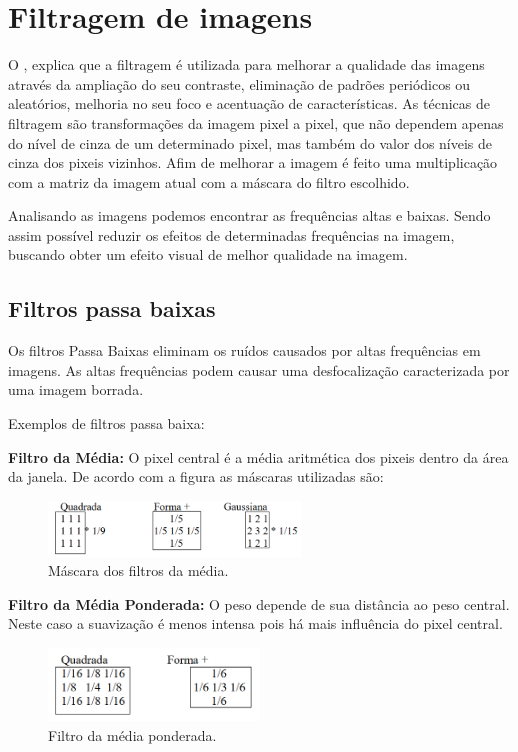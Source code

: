 \documentclass{article}
\begin{document}
\section{Filtragem de imagens}
     O , explica que a filtragem é utilizada para melhorar a qualidade das imagens através da ampliação do seu contraste, eliminação  de  padrões  periódicos  ou aleatórios, melhoria  no  seu  foco  e  acentuação  de características. As técnicas de filtragem são transformações da imagem pixel a pixel, que não dependem apenas do nível de cinza de um determinado pixel, mas também do valor dos níveis de cinza dos pixeis vizinhos. Afim de melhorar a imagem é feito uma multiplicação com a matriz da imagem atual com a máscara do filtro escolhido.
    
    Analisando as imagens  podemos  encontrar as frequências altas e baixas. Sendo assim possível  reduzir  os  efeitos  de determinadas  frequências  na imagem,  buscando obter  um  efeito  visual  de  melhor  qualidade  na  imagem.  
    
    \subsection{Filtros passa baixas}
    Os  filtros Passa  Baixas  eliminam os ruídos causados por altas frequências em imagens. As altas frequências podem causar uma  desfocalização caracterizada  por  uma  imagem borrada.
    
    Exemplos de filtros passa baixa:
     
    \textbf{Filtro da Média:} O pixel central é a média aritmética dos pixeis dentro da área da janela. De acordo com a figura as máscaras utilizadas são:
    
    \begin{figure}[H]
        \centering
        \includegraphics[width=0.6\textwidth]{template/img/fig5.png}
        \caption{Máscara dos filtros da média.}
        \label{fig:fig5}
    \end{figure}
    
    \textbf{Filtro da Média Ponderada:} O peso depende de sua distância ao peso central. Neste  caso  a  suavização  é  menos  intensa  pois  há  mais  influência  do pixel central.  
    
    \begin{figure}[H]
        \centering
        \includegraphics[width=0.5\textwidth]{template/img/fig6.png}
        \caption{Filtro da média ponderada.}
        \label{fig:fig6}
    \end{figure}
    
\end{document}

